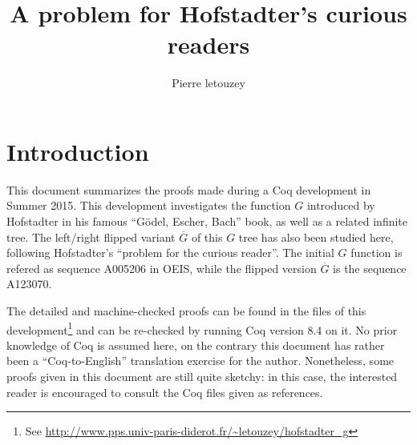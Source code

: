 \documentclass[a4paper,11pt]{article}
\title{A problem for Hofstadter's curious readers}
\author{Pierre letouzey}
\begin{document}
\newtheorem{theorem}{Theorem}
\newtheorem{definition}{Definition}
\maketitle


\newcommand{\docgen}[2]{\href{http://www.pps.univ-paris-diderot.fr/~letouzey/hofstadter_g/doc/#1.html#2}{\tt #1.v}}
\newcommand{\doc}[1]{\docgen{#1}{}}
\newcommand{\doclab}[2]{\docgen{#1}{\##2}}
\newcommand{\FG}{\ensuremath{\overline{G}}}
\newcommand{\fibrest}{\ensuremath{\Sigma F_i}}

\section{Introduction}
This document summarizes the proofs made during a Coq development in
Summer 2015. This development investigates the function $G$ introduced
by Hofstadter in his famous ``Gödel, Escher, Bach'' book\cite{GEB},
as well as a related infinite tree. The left/right flipped variant
$\FG$ of this $G$ tree has also been studied here, following
Hofstadter's ``problem for the curious reader''.
The initial $G$ function is refered as sequence A005206 in
OEIS\cite{OEIS-G}, while the flipped version $\FG$ is the sequence
A123070.

The detailed and machine-checked proofs can be found in the files
of this development\footnote{See
\url{http://www.pps.univ-paris-diderot.fr/~letouzey/hofstadter_g}}
and can be re-checked by running Coq \cite{Coq} version 8.4 on it.
No prior knowledge of Coq is assumed here, on the contrary this
document has rather been a ``Coq-to-English'' translation
exercise for the author. Nonetheless, some proofs given in this
document are still quite sketchy: in this case, the interested
reader is encouraged to consult the Coq files given as references.
\end{document}
